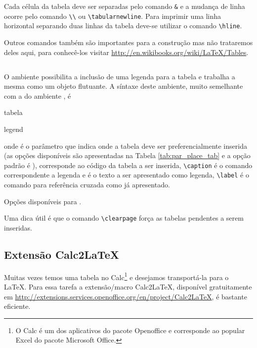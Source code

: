 Cada célula da tabela deve ser separadas pelo comando \lstinline!&! e a mudança de linha ocorre pelo comando \lstinline!\\! ou \lstinline!\tabularnewline!. Para imprimir uma linha horizontal separando duas linhas da tabela deve-se utilizar o comando \lstinline!\hline!.\\

Outros comandos também são importantes para a construção mas não trataremos deles aqui, para conhec\^{e}-los visitar \url{http://en.wikibooks.org/wiki/LaTeX/Tables}.

\subsection{}
O ambiente  possibilita a inclusão de uma legenda para a tabela e trabalha a mesma como um objeto flutuante. A síntaxe deste ambiente, muito semelhante com a do ambiente , é
\begin{code}
\begin{table}[place]
    tabela
    \caption{legend}
    \label{P:tebela}
\end{table}
\end{code}
onde  é o parâmetro que indica onde a tabela deve ser preferencialmente inserida (as opções disponíveis são apresentadas na Tabela \ref{tab:par_place_tab} e a opção padrão é ),  corresponde ao código da tabela a ser inserida, \lstinline!\caption! é o comando correspondente a legenda e  é o texto a ser apresentado como legenda, \lstinline!\label! é o comando para referência cruzada como já apresentado. \\
\begin{table}[!htb]
    \centering
    \caption{Opções disponíveis para .}
    \label{tab:par_place_tab}
    
\end{table}

Uma dica útil é que o comando \lstinline!\clearpage! força as tabelas pendentes a serem inseridas.

\subsection{Extens\~{a}o Calc2LaTeX}
Muitas vezes temos uma tabela no Calc\footnote{O Calc é um dos aplicativos do pacote Openoffice e corresponde ao popular Excel do pacote Microsoft Office.} e desejamos transportá-la para o LaTeX. Para essa tarefa a extens\~{a}o/macro Calc2LaTeX, disponível gratuitamente em \url{http://extensions.services.openoffice.org/en/project/Calc2LaTeX}, é bastante eficiente.

